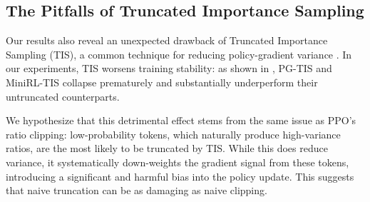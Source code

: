 \subsection{The Pitfalls of Truncated Importance Sampling}  
  

Our results also reveal an unexpected drawback of Truncated Importance Sampling (TIS), a common technique for reducing policy-gradient variance \citep{yao2025offpolicy, chen2025minimax}. In our experiments, TIS worsens training stability: as shown in , PG-TIS and MiniRL-TIS collapse prematurely and substantially underperform their untruncated counterparts. 

We hypothesize that this detrimental effect stems from the same issue as PPO's ratio clipping: low-probability tokens, which naturally produce high-variance ratios, are the most likely to be truncated by TIS. While this does reduce variance, it systematically down-weights the gradient signal from these tokens, introducing a significant and harmful bias into the policy update. This suggests that naive truncation can be as damaging as naive clipping.
